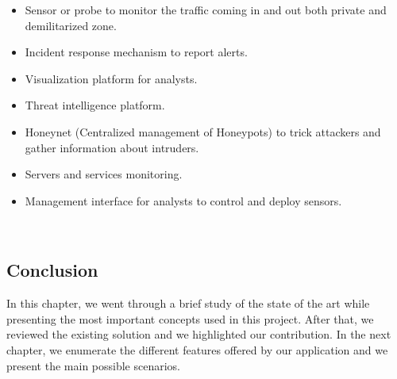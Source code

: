 \begin{itemize}
    \item Sensor or probe to monitor the traffic coming in and out both private and demilitarized zone.
    \item Incident response mechanism to report alerts.
    \item Visualization platform for analysts.
    \item Threat intelligence platform.
    \item Honeynet (Centralized management of Honeypots) to trick attackers and gather information about intruders.
    \item Servers and services monitoring.
    \item Management interface for analysts to control and deploy sensors.
\end{itemize}


~





\subsection *{Conclusion}
In this chapter, we went through a brief study of the state of the art while presenting the most important concepts used in this project. After that, we reviewed the existing solution and we highlighted our contribution.
In the next chapter, we enumerate the different features offered by our application and we present the main possible scenarios.
